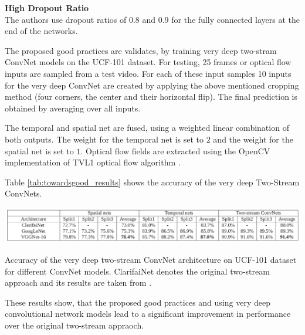 \textbf{High Dropout Ratio}\\
The authors use dropout ratios of 0.8 and 0.9 for the fully connected layers at the end of the networks.

The proposed good practices are validates, by training very deep two-stram ConvNet models on the UCF-101 dataset.
For testing, 25 frames or optical flow inputs are sampled from a test video.
For each of these input samples 10 inputs for the very deep ConvNet are created by applying the above mentioned cropping method (four corners, the center and their horizontal flip).
The final prediction is obtained by averaging over all inputs.

The temporal and spatial net are fused, using a weighted linear combination of both outputs.
The weight for the temporal net is set to $2$ and the weight for the spatial net is set to $1$.
Optical flow fields are extracted using the OpenCV implementation of TVL1 optical flow algorithm \cite{zach_duality_2007}.

Table \ref{tab:towardsgood_results} shows the accuracy of the very deep Two-Stream ConvNets.

\begin{table}[H]
    \centering
    \includegraphics[width=\textwidth]{img_deep/towardsgood_results}
    \caption{Accuracy of the very deep two-stream ConvNet architecture on UCF-101 dataset for different ConvNet models. ClarifaiNet denotes the original two-stream approach and its results are taken from \cite{simonyan_two-stream_2014}. \cite{wang_towards_2015}}
    \label{tab:towardsgood_results}
\end{table}

These results show, that the proposed good practices and using very deep convolutional network models lead to a significant improvement in performance over the original two-stream appraoch.


